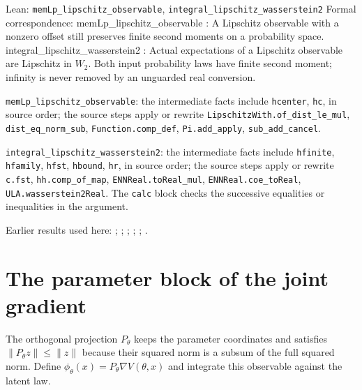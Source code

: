 \documentclass[11pt,a4paper]{article}
\begin{document}
\begin{leanbox}{Lean: \texttt{memLp\_\allowbreak{}lipschitz\_\allowbreak{}observable}, \texttt{integral\_\allowbreak{}lipschitz\_\allowbreak{}wasserstein2}}
Formal correspondence: memLp\_lipschitz\_observable : A Lipschitz observable with a nonzero offset still preserves finite second moments on a probability space. integral\_lipschitz\_wasserstein2 : Actual expectations of a Lipschitz observable are Lipschitz in \(W_2\). Both input probability laws have finite second moment; infinity is never removed by an unguarded real conversion.



\texttt{mem\allowbreak{}Lp\_\allowbreak{}lipschitz\_\allowbreak{}observable}: the intermediate facts include \texttt{hcenter}, \texttt{hc}, in source order; the source steps apply or rewrite \texttt{Lipschitz\allowbreak{}With.\allowbreak{}of\_\allowbreak{}dist\_\allowbreak{}le\_\allowbreak{}mul}, \texttt{dist\_\allowbreak{}eq\_\allowbreak{}norm\_\allowbreak{}sub}, \texttt{Function.\allowbreak{}comp\_\allowbreak{}def}, \texttt{Pi.\allowbreak{}add\_\allowbreak{}apply}, \texttt{sub\_\allowbreak{}add\_\allowbreak{}cancel}.



\texttt{integral\_\allowbreak{}lipschitz\_\allowbreak{}wasserstein2}: the intermediate facts include \texttt{hfinite}, \texttt{hfamily}, \texttt{hfst}, \texttt{hbound}, \texttt{hr}, in source order; the source steps apply or rewrite \texttt{c.\allowbreak{}fst}, \texttt{hh.\allowbreak{}comp\_\allowbreak{}of\_\allowbreak{}map}, \texttt{ENNReal.\allowbreak{}to\allowbreak{}Real\_\allowbreak{}mul}, \texttt{ENNReal.\allowbreak{}coe\_\allowbreak{}to\allowbreak{}Real}, \texttt{ULA.\allowbreak{}wasserstein2\allowbreak{}Real}. The \texttt{calc} block checks the successive equalities or inequalities in the argument.
\end{leanbox}


Earlier results used here: \cite[Section~3.17.1]{LangevinLean2026ULASC}; \cite[Section~3.17.2]{LangevinLean2026ULASC}; \cite[Section~3.17.3]{LangevinLean2026ULASC}; \cite[Section~3.17.4]{LangevinLean2026ULASC}; \cite[Section~3.18.2]{LangevinLean2026ULASC}; \cite[Section~3.21.2]{LangevinLean2026ULASC}.

\section{\texorpdfstring{The parameter block of the joint gradient}{The parameter block of the joint gradient}}


The orthogonal projection \(P_\theta\) keeps the parameter coordinates and satisfies \(\|P_\theta z\|\le\|z\|\) because their squared norm is a subsum of the full squared norm. Define \(\phi_\theta(x)=P_\theta\nabla V(\theta,x)\) and integrate this observable against the latent law.
\end{document}
